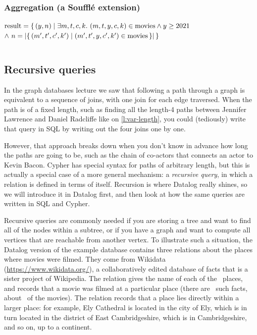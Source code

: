 \begin{frame}
    \label{s:datalog-aggregate}
    \frametitle{Aggregation (a Soufflé extension)}
    \vspace{0.3em}
    {\footnotesize
    $\mathrm{result} = \{\, (y, n) \mid \exists m, t, c, k.\ (m, t, y, c, k) \in \mathrm{movies} \wedge y \ge 2021$\\
    \hspace*{8.4em}$\wedge\ n = |\{\, (m', t', c', k') \mid (m', t', y, c', k') \in \mathrm{movies} \,\}| \,\}$}
    \par\vspace{0.3em}
    \inputminted[fontsize=\footnotesize]{sql}{code/datalog-aggregate.sql}
\end{frame}
\label{l:datalog-aggregate}

\subsection{Recursive queries}\label{sec:recursion}

In the graph databases lecture we saw that following a path through a graph is equivalent to a sequence of joins, with one join for each edge traversed.
When the path is of a fixed length, such as finding all the length-4 paths between Jennifer Lawrence and Daniel Radcliffe like on \autoref{l:var-length}, you could (tediously) write that query in SQL by writing out the four joins one by one.

However, that approach breaks down when you don't know in advance how long the paths are going to be, such as the chain of co-actors that connects an actor to Kevin Bacon.
Cypher has special syntax for paths of arbitrary length, but this is actually a special case of a more general mechanism: a \emph{recursive query}, in which a relation is defined in terms of itself.
Recursion is where Datalog really shines, so we will introduce it in Datalog first, and then look at how the same queries are written in SQL and Cypher.

Recursive queries are commonly needed if you are storing a tree and want to find all of the nodes within a subtree, or if you have a graph and want to compute all vertices that are reachable from another vertex.
To illustrate such a situation, the Datalog version of the example database contains three relations about the places where movies were filmed.
They come from Wikidata (\url{https://www.wikidata.org/}), a collaboratively edited database of facts that is a sister project of Wikipedia.
The  relation gives the name of each of the \recplaces\ places, and  records that a movie was filmed at a particular place (there are \recfilmedat\ such facts, about \recfilmedmovies\ of the movies).
The  relation records that a place lies directly within a larger place: for example, Ely Cathedral is located in the city of Ely, which is in turn located in the district of East Cambridgeshire, which is in Cambridgeshire, and so on, up to a continent.

